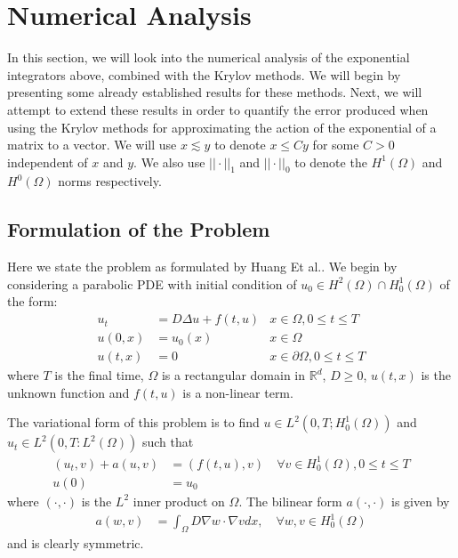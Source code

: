 \section{Numerical Analysis}

In this section, we will look into the numerical analysis of the exponential integrators above, combined with the Krylov methods.
We will begin by presenting some already established results for these methods.
Next, we will attempt to extend these results in order to quantify the error produced when using the Krylov methods for approximating the action of the exponential of a matrix to a vector.
We will use $x \lesssim y$ to denote $x \leq C y$ for some $C>0$ independent of $x$ and $y$.
We also use $||\cdot||_1$ and $||\cdot||_0$ to denote the $H^1(\Omega)$ and $H^0(\Omega)$ norms respectively.
\subsection{Formulation of the Problem}
Here we state the problem as formulated by Huang Et al.\cite{Huang2022}.
We begin by considering a parabolic PDE with initial condition of $u_0 \in H^2(\Omega) \cap H^1_0(\Omega)$ of the form:
\begin{align*}
    u_t &= D \Delta u + f(t,u) &x\in \Omega, 0 \leq t \leq T\\
    u(0,x) &= u_0(x) &x\in \Omega\\
    u(t,x) &= 0 &x\in \partial \Omega, 0 \leq t \leq T
\end{align*}
where $T$ is the final time, $\Omega$ is a rectangular domain in $\mathbb{R}^d$, $D\geq 0$, $u(t,x)$ is the unknown function and $f(t,u)$ is a non-linear term.

The variational form of this problem is to find $u\in L^2(0,T;H^1_0(\Omega))$ and $u_t \in L^2(0,T: L^2(\Omega))$ such that
\begin{align*}
    (u_t, v) + a(u, v) &= (f(t,u),v) \quad \forall v \in H^1_0(\Omega), 0\leq t \leq T\\
    u(0) &= u_0
\end{align*}
where $(\cdot,\cdot)$ is the $L^2$ inner product on $\Omega$.
The bilinear form $a(\cdot,\cdot)$ is given by
\begin{align*}
    a(w,v) &= \int_{\Omega} D \nabla w \cdot \nabla v dx, \quad \forall w, v \in H^1_0(\Omega)
\end{align*}
and is clearly symmetric.

